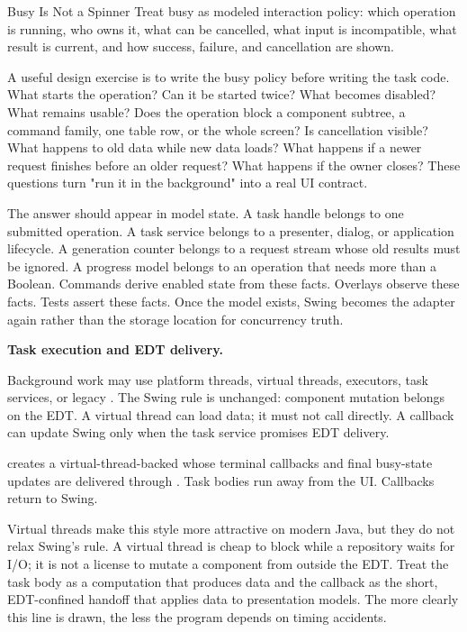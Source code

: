 \begin{principlebox}{Busy Is Not a Spinner}
Treat busy as modeled interaction policy: which operation is running, who owns
it, what can be cancelled, what input is incompatible, what result is current,
and how success, failure, and cancellation are shown.
\end{principlebox}

A useful design exercise is to write the busy policy before writing the task
code. What starts the operation? Can it be started twice? What becomes disabled?
What remains usable? Does the operation block a component subtree, a command
family, one table row, or the whole screen? Is cancellation visible? What
happens to old data while new data loads? What happens if a newer request
finishes before an older request? What happens if the owner closes? These
questions turn "run it in the background" into a real UI contract.

The answer should appear in model state. A task handle belongs to one submitted
operation. A task service belongs to a presenter, dialog, or application
lifecycle. A generation counter belongs to a request stream whose old results
must be ignored. A progress model belongs to an operation that needs more than
a Boolean. Commands derive enabled state from these facts. Overlays observe
these facts. Tests assert these facts. Once the model exists, Swing becomes
the adapter again rather than the storage location for concurrency truth.

\textbf{Task execution and EDT delivery.}

Background work may use platform threads, virtual threads, executors, task
services, or legacy . The Swing rule is unchanged: component
mutation belongs on the EDT. A virtual thread can load data; it must not call
 directly. A callback can update Swing only when the task
service promises EDT delivery.

 creates a virtual-thread-backed
 whose terminal callbacks and final busy-state updates are
delivered through . Task bodies run away from the UI.
Callbacks return to Swing.

Virtual threads make this style more attractive on modern Java, but they do not
relax Swing's rule. A virtual thread is cheap to block while a repository waits
for I/O; it is not a license to mutate a component from outside the EDT. Treat
the task body as a computation that produces data and the callback as the
short, EDT-confined handoff that applies data to presentation models. The more
clearly this line is drawn, the less the program depends on timing accidents.

